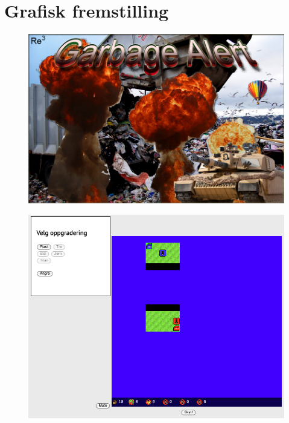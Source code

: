 \section{Grafisk fremstilling}

\begin{center}
\begin{figure}
\includegraphics[scale=0.75]{images/splashscreen.png}
\label{fig:splashscreen}
\end{figure}
\end{center}

\begin{center}
\begin{figure}
\includegraphics[scale=0.75]{images/Oppgradering.png}
\label{fig:Oppgradering}
\end{figure}
\end{center}

